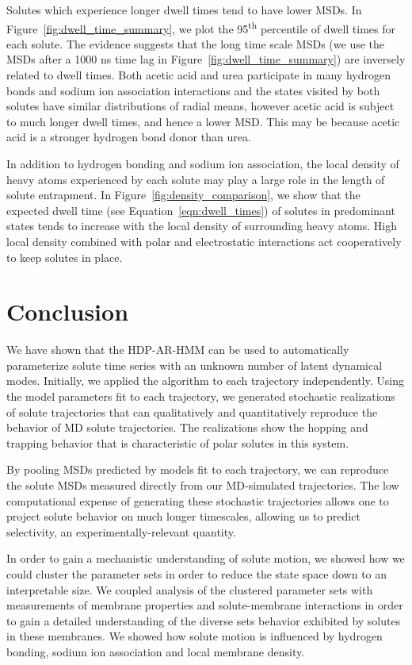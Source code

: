 \documentclass[journal=jpcbfk,manuscript=article]{achemso}
\begin{document}
  Solutes which experience longer dwell times tend to have lower MSDs. 
  In Figure~\ref{fig:dwell_time_summary}, we plot the 95\textsuperscript{th}
  percentile of dwell times for each solute. The evidence suggests that the 
  long time scale MSDs (we use the MSDs after a 1000 ns time lag in Figure~\ref{fig:dwell_time_summary})
  are inversely related to dwell times. Both acetic acid and urea participate 
  in many hydrogen bonds and sodium ion association interactions and the states
  visited by both solutes have similar distributions of radial means, however
  acetic acid is subject to much longer dwell times, and hence a lower MSD. 
  This may be because acetic acid is a stronger hydrogen bond donor than urea.
  
  In addition to hydrogen bonding and sodium ion association, the local density 
  of heavy atoms experienced by each solute may play a large role in the length
  of solute entrapment. In Figure~\ref{fig:density_comparison}, we show that the
  expected dwell time (see Equation~\ref{eqn:dwell_times}) of solutes in 
  predominant states tends to increase with the local density of surrounding 
  heavy atoms. High local density combined with polar and electrostatic 
  interactions act cooperatively to keep solutes in place.
  
  \section{Conclusion}
  
  We have shown that the HDP-AR-HMM can be used to automatically parameterize solute 
  time series with an unknown number of latent dynamical modes. Initially, we applied
  the algorithm to each trajectory independently. Using the model parameters fit
  to each trajectory, we generated stochastic realizations of solute trajectories that
  can qualitatively and quantitatively reproduce the behavior of MD solute 
  trajectories. The realizations show the hopping and trapping behavior that is
  characteristic of polar solutes in this system. 
  
  By pooling MSDs predicted by models fit to each trajectory, we can reproduce
  the solute MSDs measured directly from our MD-simulated trajectories. 
  The low computational expense of generating these stochastic trajectories allows
  one to project solute behavior on much longer timescales, allowing us to predict
  selectivity, an experimentally-relevant quantity.
  
  In order to gain a mechanistic understanding of solute motion, we showed how 
  we could cluster the parameter sets in order to reduce the state space down
  to an interpretable size. We coupled analysis of the clustered parameter sets
  with measurements of membrane properties and solute-membrane interactions 
  in order to gain a detailed understanding of the diverse sets behavior 
  exhibited by solutes in these membranes. We showed how
  solute motion is influenced by hydrogen bonding, sodium ion association and local
  membrane density.
  
\end{document}
